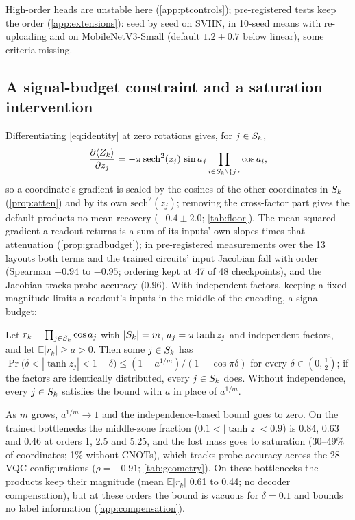 High-order heads are unstable here (\cref{app:ptcontrols}); pre-registered tests keep the order (\cref{app:extensions}): seed by seed on SVHN, in 10-seed means with re-uploading and on
MobileNetV3-Small (default $1.2\pm0.7$ below linear), some criteria missing.

\subsection{A signal-budget constraint and a saturation intervention}
\label{sec:saturation}



Differentiating \cref{eq:identity} at zero rotations gives, for $j\in S_k$,
\begin{equation}
  \frac{\partial \langle Z_{k}\rangle}{\partial z_j}
  = -\pi\,\mathrm{sech}^2(z_j)\,\sin a_{j}\prod_{i\in S_k\setminus\{j\}}\cos a_{i},
  \label{eq:grad}
\end{equation}
so a coordinate's gradient is scaled by the cosines of the other coordinates in $S_k$
(\cref{prop:atten}) and by its own $\mathrm{sech}^2(z_j)$; removing the cross-factor part gives the default products no mean recovery ($-0.4\pm2.0$; \cref{tab:floor}). The mean squared gradient a readout returns is a sum of its inputs' own slopes times that attenuation (\cref{prop:gradbudget}); in pre-registered measurements over the 13 layouts both terms and the trained circuits' input Jacobian fall with order (Spearman $-0.94$ to $-0.95$; ordering kept at 47 of 48 checkpoints), and the Jacobian tracks probe accuracy ($0.96$). With independent factors, keeping a fixed magnitude limits a readout's inputs in the middle of the encoding, a signal budget:
\begin{proposition}\label{prop:budget}
Let $r_k=\prod_{j\in S_k}\cos a_{j}$ with $|S_k|=m$, $a_{j}=\pi\tanh z_j$ and independent factors, and
let $\mathbb{E}|r_k|\ge a>0$. Then some $j\in S_k$ has
$\Pr\big(\delta<|\tanh z_j|<1-\delta\big)\le(1-a^{1/m})/(1-\cos\pi\delta)$ for every
$\delta\in(0,\tfrac12)$; if the factors are identically distributed, every $j\in S_k$ does. Without
independence, every $j\in S_k$ satisfies the bound with $a$ in place of $a^{1/m}$.
\end{proposition}
As $m$ grows, $a^{1/m}\to1$ and the independence-based bound goes to zero. On the trained
bottlenecks the middle-zone fraction ($0.1<|\tanh z|<0.9$) is 0.84, 0.63 and 0.46 at orders 1, 2.5
and 5.25, and the lost mass goes to saturation (30--49\% of coordinates; 1\% without CNOTs), which tracks probe accuracy across the 28 VQC configurations ($\rho=-0.91$; \cref{tab:geometry}).
On these bottlenecks the products keep their magnitude (mean $\mathbb{E}|r_k|$ 0.61 to 0.44; no decoder
compensation), but at these orders the bound is vacuous for $\delta=0.1$ and bounds no label information (\cref{app:compensation}).

